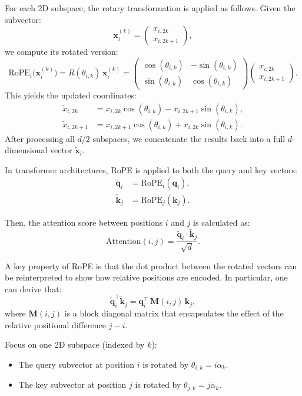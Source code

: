 For each 2D subspace, the rotary transformation is applied as follows. Given the subvector:
\[
\mathbf{x}_i^{(k)} = 
\begin{pmatrix}
x_{i,2k} \\
x_{i,2k+1}
\end{pmatrix},
\]
we compute its rotated version:
\[
\text{RoPE}_i \bigl(\mathbf{x}_i^{(k)}\bigr)
= R(\theta_{i, k})\, \mathbf{x}_i^{(k)}
= \begin{pmatrix}
\cos(\theta_{i, k}) & -\sin(\theta_{i, k}) \\
\sin(\theta_{i, k}) & \cos(\theta_{i, k})
\end{pmatrix}
\begin{pmatrix}
x_{i,2k} \\
x_{i,2k+1}
\end{pmatrix}.
\]
This yields the updated coordinates:
\[
\begin{aligned}
\tilde{x}_{i, 2k} &= x_{i,2k}\cos(\theta_{i,k}) - x_{i,2k+1}\sin(\theta_{i,k}),\\[6pt]
\tilde{x}_{i, 2k+1} &= x_{i,2k+1}\cos(\theta_{i,k}) + x_{i,2k}\sin(\theta_{i,k}).
\end{aligned}
\]
After processing all \(d/2\) subspaces, we concatenate the results back into a full \(d\)-dimensional vector \(\tilde{\mathbf{x}}_i\).

In transformer architectures, RoPE is applied to both the query and key vectors:
\[
\begin{aligned}
\tilde{\mathbf{q}}_i &= \text{RoPE}_i(\mathbf{q}_i), \\
\tilde{\mathbf{k}}_j &= \text{RoPE}_j(\mathbf{k}_j).
\end{aligned}
\]

Then, the attention score between positions \(i\) and \(j\) is calculated as:
\[
\text{Attention}(i, j) = \frac{\tilde{\mathbf{q}}_i \cdot \tilde{\mathbf{k}}_j}{\sqrt{d}}.
\]

A key property of RoPE is that the dot product between the rotated vectors can be reinterpreted to show how relative positions are encoded. In particular, one can derive that:
\[
\tilde{\mathbf{q}}_i^\top \tilde{\mathbf{k}}_j = \mathbf{q}_i^\top\, \mathbf{M}(i,j)\, \mathbf{k}_j,
\]
where \(\mathbf{M}(i,j)\) is a block diagonal matrix that encapsulates the effect of the relative positional difference \(j-i\).



Focus on one 2D subspace (indexed by \(k\)):
\begin{itemize}
	\item The query subvector at position \(i\) is rotated by \(\theta_{i,k} = i\alpha_k\).
	\item The key subvector at position \(j\) is rotated by \(\theta_{j,k} = j\alpha_k\).
\end{itemize}

